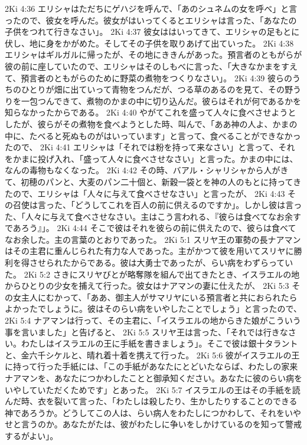 2Ki 4:36  エリシャはただちにゲハジを呼んで、「あのシュネムの女を呼べ」と言ったので、彼女を呼んだ。彼女がはいってくるとエリシャは言った、「あなたの子供をつれて行きなさい」。
2Ki 4:37  彼女ははいってきて、エリシャの足もとに伏し、地に身をかがめた。そしてその子供を取りあげて出ていった。
2Ki 4:38  エリシャはギルガルに帰ったが、その地にききんがあった。預言者のともがらが彼の前に座していたので、エリシャはそのしもべに言った、「大きなかまをすえて、預言者のともがらのために野菜の煮物をつくりなさい」。
2Ki 4:39  彼らのうちのひとりが畑に出ていって青物をつんだが、つる草のあるのを見て、その野うりを一包つんできて、煮物のかまの中に切り込んだ。彼らはそれが何であるかを知らなかったからである。
2Ki 4:40  やがてこれを盛って人々に食べさせようとしたが、彼らがその煮物を食べようとした時、叫んで、「ああ神の人よ、かまの中に、たべると死ぬものがはいっています」と言って、食べることができなかったので、
2Ki 4:41  エリシャは「それでは粉を持って来なさい」と言って、それをかまに投げ入れ、「盛って人々に食べさせなさい」と言った。かまの中には、なんの毒物もなくなった。
2Ki 4:42  その時、バアル・シャリシャから人がきて、初穂のパンと、大麦のパン二十個と、新穀一袋とを神の人のもとに持ってきたので、エリシャは「人々に与えて食べさせなさい」と言ったが、
2Ki 4:43  その召使は言った、「どうしてこれを百人の前に供えるのですか」。しかし彼は言った、「人々に与えて食べさせなさい。主はこう言われる、『彼らは食べてなお余すであろう』」。
2Ki 4:44  そこで彼はそれを彼らの前に供えたので、彼らは食べてなお余した。主の言葉のとおりであった。
2Ki 5:1  スリヤ王の軍勢の長ナアマンはその主君に重んじられた有力な人であった。主がかつて彼を用いてスリヤに勝利を得させられたからである。彼は大勇士であったが、らい病をわずらっていた。
2Ki 5:2  さきにスリヤびとが略奪隊を組んで出てきたとき、イスラエルの地からひとりの少女を捕えて行った。彼女はナアマンの妻に仕えたが、
2Ki 5:3  その女主人にむかって、「ああ、御主人がサマリヤにいる預言者と共におられたらよかったでしょうに。彼はそのらい病をいやしたことでしょう」と言ったので、
2Ki 5:4  ナアマンは行って、その主君に、「イスラエルの地からきた娘がこういう事を言いました」と告げると、
2Ki 5:5  スリヤ王は言った、「それでは行きなさい。わたしはイスラエルの王に手紙を書きましょう」。そこで彼は銀十タラントと、金六千シケルと、晴れ着十着を携えて行った。
2Ki 5:6  彼がイスラエルの王に持って行った手紙には、「この手紙があなたにとどいたならば、わたしの家来ナアマンを、あなたにつかわしたことと御承知ください。あなたに彼のらい病をいやしていただくためです」とあった。
2Ki 5:7  イスラエルの王はその手紙を読んだ時、衣を裂いて言った、「わたしは殺したり、生かしたりすることのできる神であろうか。どうしてこの人は、らい病人をわたしにつかわして、それをいやせと言うのか。あなたがたは、彼がわたしに争いをしかけているのを知って警戒するがよい」。
